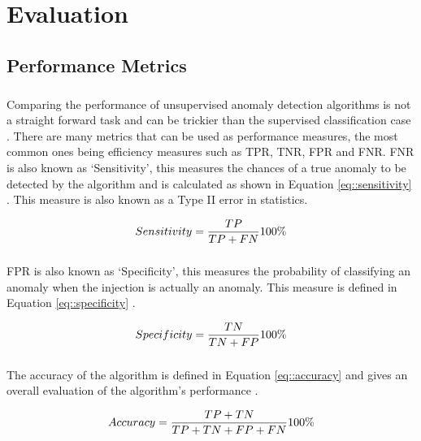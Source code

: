 \chapter{Evaluation}
\label{chp5}

\section{Performance Metrics}

\paragraph{ }Comparing the performance of unsupervised anomaly detection algorithms is not a straight forward task and can be trickier than the supervised classification case \cite{Goldstein2016}. There are many metrics that can be used as performance measures, the most common ones being efficiency measures such as \ac{TPR}, \ac{TNR}, \ac{FPR} and \ac{FNR}. \acs{FNR} is also known as `Sensitivity', this measures the chances of a true anomaly to be detected by the algorithm and is calculated as shown in Equation \ref{eq::sensitivity} \cite{Danjuma2015}. This measure is also known as a Type II error in statistics.

\begin{equation}\label{eq::sensitivity}
\centering
Sensitivity=\frac{TP}{TP+FN}100\%
\end{equation}

\paragraph{ }\acs{FPR} is also known as `Specificity', this measures the probability of classifying an anomaly when the injection is actually an anomaly. This measure is defined in Equation \ref{eq::specificity} \cite{Danjuma2015}.

\begin{equation}\label{eq::specificity}
\centering
Specificity=\frac{TN}{TN+FP}100\%
\end{equation}

\paragraph{ }The accuracy of the algorithm is defined in Equation \ref{eq::accuracy} and gives an overall evaluation of the algorithm's performance \cite{Danjuma2015}.

\begin{equation}\label{eq::accuracy}
\centering
Accuracy=\frac{TP+TN}{TP+TN+FP+FN}100\%
\end{equation}

